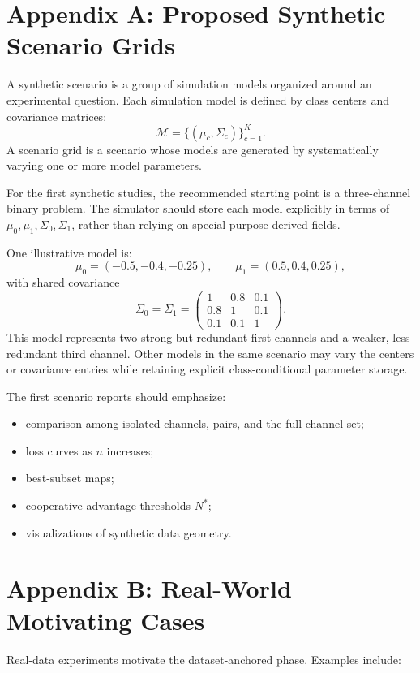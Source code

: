 \documentclass[11pt,a4paper]{article}
\begin{document}
\appendix

\section{Appendix A: Proposed Synthetic Scenario Grids}

A synthetic scenario is a group of simulation models organized around an experimental question. Each simulation model is defined by class centers and covariance matrices:
\[
    \mathcal{M}=\{(\mu_c,\Sigma_c)\}_{c=1}^{K}.
\]
A scenario grid is a scenario whose models are generated by systematically varying one or more model parameters.

For the first synthetic studies, the recommended starting point is a three-channel binary problem. The simulator should store each model explicitly in terms of $\mu_0,\mu_1,\Sigma_0,\Sigma_1$, rather than relying on special-purpose derived fields.

One illustrative model is:
\[
    \mu_0=(-0.5,-0.4,-0.25),
    \qquad
    \mu_1=(0.5,0.4,0.25),
\]
with shared covariance
\[
\Sigma_0=\Sigma_1=
\begin{pmatrix}
1 & 0.8 & 0.1\\
0.8 & 1 & 0.1\\
0.1 & 0.1 & 1
\end{pmatrix}.
\]
This model represents two strong but redundant first channels and a weaker, less redundant third channel. Other models in the same scenario may vary the centers or covariance entries while retaining explicit class-conditional parameter storage.

The first scenario reports should emphasize:
\begin{itemize}
    \item comparison among isolated channels, pairs, and the full channel set;
    \item loss curves as $n$ increases;
    \item best-subset maps;
    \item cooperative advantage thresholds $N^*$;
    \item visualizations of synthetic data geometry.
\end{itemize}

\section{Appendix B: Real-World Motivating Cases}

Real-data experiments motivate the dataset-anchored phase. Examples include:
\end{document}
